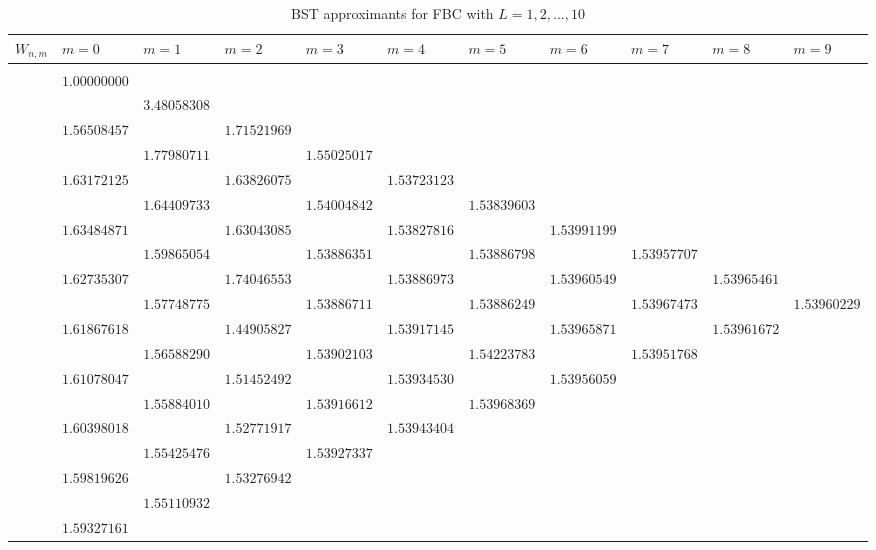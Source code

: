 \documentclass[3p, 10pt, onecolumn]{elsarticle}
\begin{document}
\begin{table}[tbp] \centering%
\scriptsize
\begin{tabular}{lllllllllll}

\hline\hline
$W_{n,m}$ & $m=0$ & $m=1$ & $m=2$ & $m=3$ & $m=4$ & $m=5$ & $m=6$ & $m=7$ & $%
m=8$ & $m=9$ \\ \hline
&  &  &  &  &  &  &  &  &  &  \\ 
& $1.000000000$ &  &  &  &  &  &  &  &  &  \\ 
&  & $3.480583082$ &  &  &  &  &  &  &  &  \\ 
& $1.565084577$ &  & $1.715219692$ &  &  &  &  &  &  &  \\ 
&  & $1.779807114$ &  & $1.550250173$ &  &  &  &  &  &  \\ 
& $1.631721258$ &  & $1.638260759$ &  & $1.537231234$ &  &  &  &  &  \\ 
&  & $1.644097339$ &  & $1.540048426$ &  & $1.538396031$ &  &  &  &  \\ 
& $1.634848714$ &  & $1.630430852$ &  & $1.538278167$ &  & $1.539911992$ & 
&  &  \\ 
&  & $1.598650546$ &  & $1.538863512$ &  & $1.538867985$ &  & $1.539577074$
&  &  \\ 
& $1.627353072$ &  & $1.740465533$ &  & $1.538869734$ &  & $1.539605491$ & 
& $1.539654610$ &  \\ 
&  & $1.577487753$ &  & $1.538867110$ &  & $1.538862496$ &  & $1.539674735$
&  & $1.539602290$ \\ 
& $1.618676186$ &  & $1.449058272$ &  & $1.539171458$ &  & $1.539658715$ & 
& $1.539616720$ &  \\ 
&  & $1.565882904$ &  & $1.539021038$ &  & $1.542237835$ &  & $1.539517684$
&  &  \\ 
& $1.610780478$ &  & $1.514524921$ &  & $1.539345304$ &  & $1.539560599$ & 
&  &  \\ 
&  & $1.558840107$ &  & $1.539166123$ &  & $1.539683697$ &  &  &  &  \\ 
& $1.603980184$ &  & $1.527719176$ &  & $1.539434047$ &  &  &  &  &  \\ 
&  & $1.554254763$ &  & $1.539273370$ &  &  &  &  &  &  \\ 
& $1.598196268$ &  & $1.532769420$ &  &  &  &  &  &  &  \\ 
&  & $1.551109328$ &  &  &  &  &  &  &  &  \\ 
& $1.593271613$ &  &  &  &  &  &  &  &  &  \\ \hline\hline
\end{tabular}%
\caption{BST approximants for FBC with $L=1,2,...,10$}\label{Table:BSTFBC}%
\end{table}%
\end{document}
